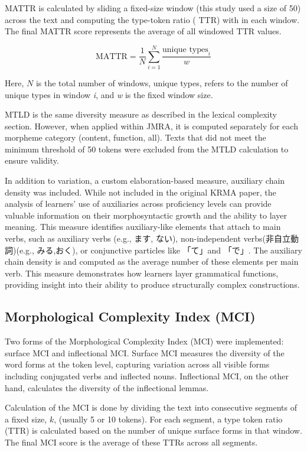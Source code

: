 MATTR is calculated by sliding a fixed-size window (this study used a size of 50) across the text and computing the
type-token ratio (
TTR) with in each window. The final MATTR score represents the average of all windowed TTR values.

\begin{equation}
    \text{MATTR} = \frac{1}{N} \sum_{i=1}^{N} \frac{\text{unique types}_i}{w}
\end{equation}

Here, $N$ is the total number of windows, unique types, refers to the number of unique types in window \textit{i}, and
\textit{w} is
the
fixed window size.

MTLD is the same diversity measure as described in the lexical complexity section. However, when applied within
JMRA, it is computed separately for each morpheme category (content, function, all). Texts that did not meet the
minimum threshold of 50 tokens were excluded from the MTLD calculation to ensure validity.

In addition to variation, a custom elaboration-based measure, auxiliary chain density was included. While not
included in the original KRMA paper, the analysis of learners' use of auxiliaries across proficiency levels can
provide valuable
information on their morphosyntactic growth and the ability to layer meaning.
This measure
identifies auxiliary-like elements that attach to main verbs, such as
auxiliary verbs (e.g., ます, ない), non-independent verbs(非自立動詞)(e.g., みる,おく), or conjunctive particles like 「て」and 「で」. The
auxiliary chain density is and
computed as the
average
number of these elements per main verb. This measure demonstrates how learners layer grammatical functions,
providing insight into their ability to produce structurally complex constructions.

\subsection{Morphological Complexity Index (MCI)}

Two forms of the Morphological Complexity Index (MCI) were implemented:
surface
MCI and
inflectional MCI. Surface MCI measures the diversity of the word forms at the token level, capturing variation
across all visible forms including conjugated verbs and inflected nouns. Inflectional MCI, on the other hand,
calculates the diversity of
the inflectional lemmas.

Calculation of the MCI is done by dividing the text into consecutive segments of a fixed size, $k$, (usually 5
or 10
tokens). For each segment, a type token ratio (TTR) is calculated based on the number of unique surface forms in
that window. The final MCI score is the average of these TTRs across all segments.

